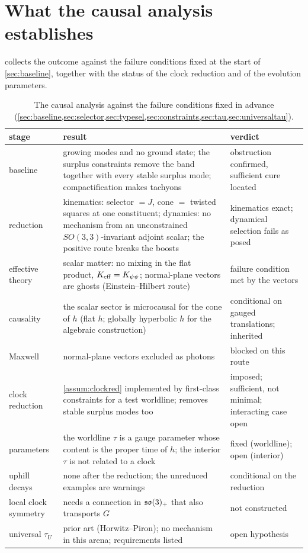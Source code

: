 \section{What the causal analysis establishes}
\label{sec:causalverdict}

 collects the outcome against the failure conditions fixed at the start of \cref{sec:baseline}, together with the status of the clock reduction and of the evolution parameters.

\begin{table}[t]
\centering
\small
\begin{tabular}{@{}>{\raggedright\arraybackslash}p{2.3cm}>{\raggedright\arraybackslash}p{6.6cm}>{\raggedright\arraybackslash}p{5.1cm}@{}}
\toprule
stage & result & verdict\\
\midrule
baseline & growing modes and no ground state; the surplus constraints remove the band together with every stable surplus mode; compactification makes tachyons & obstruction confirmed, sufficient cure located\\
reduction & kinematics: selector $=J$, cone $=$ twisted squares at one constituent; dynamics: no mechanism from an unconstrained $SO(3,3)$-invariant adjoint scalar; the positive route breaks the boosts &
kinematics exact; dynamical selection fails as posed\\
effective theory & scalar matter: no mixing in the flat product, $K_{\rm eff}=K_{\psi\psi}$; normal-plane vectors are ghosts (Einstein--Hilbert route) & failure condition met by the vectors\\
causality & the scalar sector is microcausal for the cone of $h$ (flat $h$; globally hyperbolic $h$ for the algebraic construction) & conditional on gauged translations; inherited\\
Maxwell & normal-plane vectors excluded as photons & blocked on this route\\
clock reduction & \cref{assum:clockred} implemented by first-class constraints for a test worldline; removes stable surplus modes too &
imposed; sufficient, not minimal; interacting case open\\
parameters & the worldline $\tau$ is a gauge parameter whose content is the proper time of $h$; the interior $\tau$ is not related to a clock &
fixed (worldline); open (interior)\\
uphill decays & none after the reduction; the unreduced examples are warnings & conditional on the reduction\\
local clock symmetry & needs a connection in $\mathfrak{so}(3)_+$ that also transports $G$ & not constructed\\
universal $\tau_U$ & prior art (Horwitz--Piron); no mechanism in this arena; requirements listed & open hypothesis\\
\bottomrule
\end{tabular}
\caption{The causal analysis against the failure conditions fixed in advance (\cref{sec:baseline,sec:selector,sec:typesel,sec:constraints,sec:tau,sec:universaltau}).}
\label{tab:causal}
\end{table}

